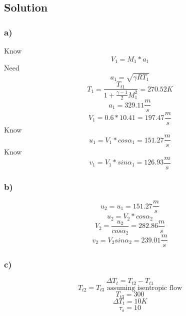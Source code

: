 \documentclass[preview,12pt]{article}
\begin{document}
\subsection*{Solution}

\subsubsection*{a)}
Know
$$V_1=M_1*a_1$$
Need 
$$a_1=\sqrt{\gamma R T_1}$$
$$T_1=\frac{T_{t1}}{1+\frac{\gamma-1}{2}M_1^2}=270.52K$$
$$a_1=329.11\frac{m}{s}$$
$$V_1=0.6*10.41=\boxed{197.47\frac{m}{s}}$$
Know
$$u_1=V_1*cos\alpha_1=\boxed{151.27\frac{m}{s}}$$
Know
$$v_1=V_1*sin\alpha_1=\boxed{126.93\frac{m}{s}}$$

\subsubsection*{b)}
$$u_2=u_1=\boxed{151.27\frac{m}{s}}$$
$$u_2=V_2*cos\alpha_2$$
$$V_2=\frac{u_2}{cos\alpha_2}=\boxed{282.86 \frac{m}{s}}$$
$$v_2=V_2sin\alpha_2=\boxed{239.01\frac{m}{s}}$$

\subsubsection*{c)}
$$\Delta T_t=T_{t2}-T_{t1}$$
$$T_{t2}=T_{t3} \textrm{ assuming isentropic flow}$$
$$T_{t3}=300$$
$$\Delta T_t = 10K$$
$$\tau_s=10$$
\end{document}
